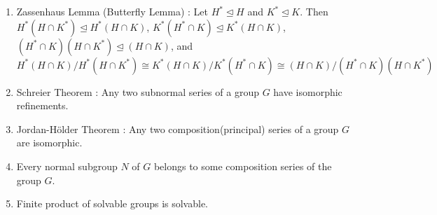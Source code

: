 \begin{enumerate}
	\item Zassenhaus Lemma (Butterfly Lemma) : Let $H^\ast \trianglelefteq H$ and $K^\ast \trianglelefteq K$. Then 
	\subitem $H^\ast(H \cap K^\ast) \trianglelefteq H^\ast(H \cap K)$,
	\subitem $K^\ast(H^\ast \cap K) \trianglelefteq K^\ast(H \cap K)$,
	\subitem $(H^\ast \cap K)(H \cap K^\ast) \trianglelefteq (H \cap K)$, and 
		$$ H^\ast(H \cap K)/H^\ast(H \cap K^\ast) \cong K^\ast(H \cap K)/K^\ast(H^\ast \cap K) \cong (H \cap K)/(H^\ast \cap K)(H \cap K^\ast) $$
	\item Schreier Theorem : Any two subnormal series of a group $G$ have isomorphic refinements.
	\item Jordan-H\"older Theorem : Any two composition(principal) series of a group $G$ are isomorphic.
	\item Every normal subgroup $N$ of $G$ belongs to some composition series of the group $G$.
	\item Finite product of solvable groups is solvable.
\end{enumerate}

